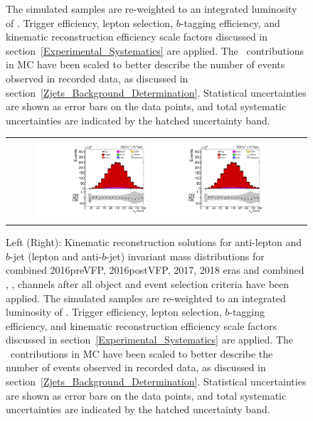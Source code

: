 \begin{figure}[htb]
\begin{center}
{        The simulated samples are re-weighted to an integrated luminosity of \lumivalueRuniiUL.
        Trigger efficiency, lepton selection, $b$-tagging efficiency, and kinematic reconstruction efficiency scale factors discussed in section~\ref{Experimental_Systematics} are applied.
        The \zjets\ contributions in MC have been scaled to better describe the number of events observed in recorded data, as discussed in section~\ref{Zjets_Background_Determination}.
        Statistical uncertainties are shown as error bars on the data points, and total systematic uncertainties are indicated by the hatched uncertainty band.
        }
        \label{bjet_control}
    \end{center}
\end{figure}

\begin{figure}[htb]
    \begin{center}
        \begin{tabular}{cc}
            \includegraphics[width=0.40\textwidth]{fig_fullRun2UL/controlplots/combined/HypAntiLeptonBjetMass.pdf}
            \includegraphics[width=0.40\textwidth]{fig_fullRun2UL/controlplots/combined/HypLeptonBjetMass.pdf}
        \end{tabular}
        \caption{\footnotesize Left (Right): Kinematic reconstruction solutions for anti-lepton and $b$-jet (lepton and anti-$b$-jet) invariant mass distributions for combined 2016preVFP, 2016postVFP, 2017, 2018 eras and combined \ee, \emu, \mumu channels after all object and event selection criteria have been applied.
        The simulated samples are re-weighted to an integrated luminosity of \lumivalueRuniiUL.
        Trigger efficiency, lepton selection, $b$-tagging efficiency, and kinematic reconstruction efficiency scale factors discussed in section~\ref{Experimental_Systematics} are applied.
        The \zjets\ contributions in MC have been scaled to better describe the number of events observed in recorded data, as discussed in section~\ref{Zjets_Background_Determination}.
        Statistical uncertainties are shown as error bars on the data points, and total systematic uncertainties are indicated by the hatched uncertainty band.
        }
        \label{leptonbjet_control}
    \end{center}
\end{figure}

